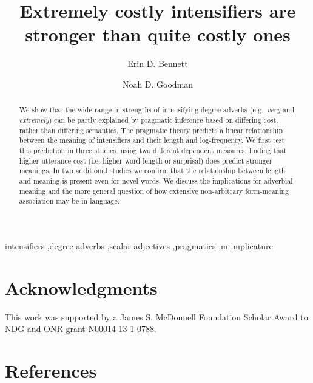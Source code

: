 \documentclass[final,5p,times,twocolumn,authoryear]{elsarticle}
\newcommand{\w}[1]{\emph{#1}}
\begin{document}
\begin{frontmatter}

\title{Extremely costly intensifiers are stronger than quite costly ones}
 

\author{Erin D. Bennett}

\author{Noah D. Goodman}

\address{Department of Psychology, Stanford University \\
450 Serra Mall, Building 420 \\
Stanford, CA, USA, 94305-2130
}

\begin{abstract}
We show that the wide range in strengths of intensifying degree adverbs (e.g.~\w{very} and \w{extremely}) can be partly explained by pragmatic inference based on differing cost, rather than differing semantics.
The pragmatic theory predicts a linear relationship between the meaning of intensifiers and their length and log-frequency.
We first test this prediction in three studies, using two different dependent measures, finding that higher utterance cost (i.e. higher word length or surprisal) does predict stronger meanings.
In two additional studies we confirm that the relationship between length and meaning is present even for novel words.
We discuss the implications for adverbial meaning and the more general question of how extensive non-arbitrary form-meaning association may be in language.
\end{abstract}

\begin{keyword}
intensifiers \sep degree adverbs  \sep scalar adjectives%
\sep pragmatics  \sep m-implicature
\end{keyword}

\end{frontmatter}















\section*{Acknowledgments}

This work was supported by a James S. McDonnell Foundation Scholar Award to NDG and ONR grant N00014-13-1-0788.



\section*{References}

  
 
\end{document}
